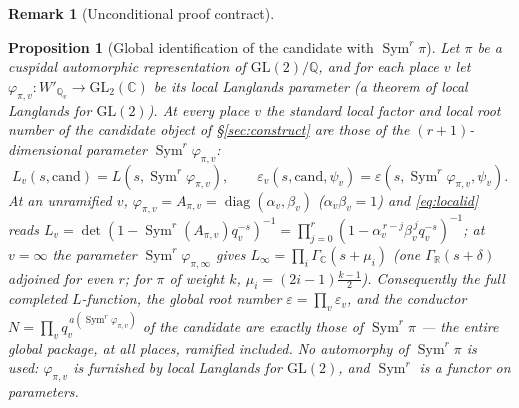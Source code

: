 \documentclass[11pt]{article}
\newtheorem{proposition}[theorem]{Proposition}
\theoremstyle{definition}
\newtheorem{remark}[theorem]{Remark}
\newcommand{\Sym}{\operatorname{Sym}}
\begin{document}
\begin{remark}[Unconditional proof contract]
\begin{enumerate}
\begin{proposition}[Global identification of the candidate with $\Sym^r\pi$]\label{prop:localid}
Let $\pi$ be a cuspidal automorphic representation of $\mathrm{GL}(2)/\mathbb Q$, and for each place $v$
let $\varphi_{\pi,v}\colon W'_{\mathbb Q_v}\to\mathrm{GL}_2(\mathbb C)$ be its local Langlands parameter
(a theorem of local Langlands for $\mathrm{GL}(2)$). At \emph{every} place $v$ the standard local factor
and local root number of the candidate object of \S\ref{sec:construct} are those of the $(r{+}1)$-dimen\-sional
parameter $\Sym^r\varphi_{\pi,v}$:
\begin{equation}\label{eq:localid}
  L_v(s,\mathrm{cand})=L\!\left(s,\Sym^r\varphi_{\pi,v}\right),\qquad
  \varepsilon_v(s,\mathrm{cand},\psi_v)=\varepsilon\!\left(s,\Sym^r\varphi_{\pi,v},\psi_v\right).
\end{equation}
At an unramified $v$, $\varphi_{\pi,v}=A_{\pi,v}=\operatorname{diag}(\alpha_v,\beta_v)$ ($\alpha_v\beta_v
=1$) and \eqref{eq:localid} reads $L_v=\det(1-\Sym^r(A_{\pi,v})q_v^{-s})^{-1}=\prod_{j=0}^{r}(1-\alpha_v^{
\,r-j}\beta_v^{\,j}q_v^{-s})^{-1}$; at $v=\infty$ the parameter $\Sym^r\varphi_{\pi,\infty}$ gives
$L_\infty=\prod_i\Gamma_{\mathbb C}(s+\mu_i)$ (one $\Gamma_{\mathbb R}(s+\delta)$ adjoined for even $r$;
for $\pi$ of weight $k$, $\mu_i=(2i{-}1)\tfrac{k-1}2$). Consequently the \emph{full} completed
$L$-function, the global root number $\varepsilon=\prod_v\varepsilon_v$, and the conductor
$N=\prod_v q_v^{\,a(\Sym^r\varphi_{\pi,v})}$ of the candidate are exactly those of $\Sym^r\pi$ --- the
entire global package, at all places, ramified included. No automorphy of $\Sym^r\pi$ is used:
$\varphi_{\pi,v}$ is furnished by local Langlands for $\mathrm{GL}(2)$, and $\Sym^r$ is a functor on
parameters.
\end{proposition}


\end{enumerate}
\end{remark}
\end{document}
